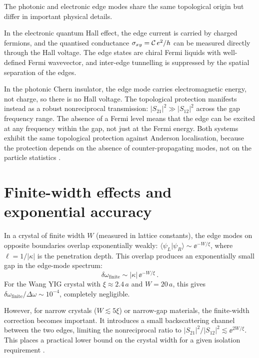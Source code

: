 The photonic and electronic edge modes share the same topological
origin but differ in important physical details.

In the electronic quantum Hall effect, the edge current is carried by
charged fermions, and the quantised conductance
$\sigma_{xy}=\mathcal{C}\,e^2/h$ can be measured directly through the Hall
voltage.  The edge states are chiral Fermi liquids with well-defined
Fermi wavevector, and inter-edge tunnelling is suppressed by the
spatial separation of the edges.

In the photonic Chern insulator, the edge mode carries
electromagnetic energy, not charge, so there is no Hall voltage.
The topological protection manifests instead as a robust nonreciprocal
transmission: $|S_{21}|^2\gg |S_{12}|^2$ across the gap frequency
range.  The absence of a Fermi level means that the edge can be
excited at any frequency within the gap, not just at the Fermi energy.
Both systems exhibit the same topological protection against Anderson
localisation, because the protection depends on the absence of
counter-propagating modes, not on the particle statistics
\cite{ozawa2018topological,price2022roadmap}.

\section{Finite-width effects and exponential accuracy}
\label{sec:ch8-finite-width}

In a crystal of finite width $W$ (measured in lattice constants), the
edge modes on opposite boundaries overlap exponentially weakly:
$\langle\psi_L|\psi_R\rangle\sim\ee^{-W/\xi}$, where
$\ell=1/|\kappa|$ is the penetration depth.  This overlap produces
an exponentially small gap in the edge-mode spectrum:
\begin{equation}\label{eq:ch8-finite-gap}
  \delta\omega_{\mathrm{finite}}
  \sim |\kappa|\,\ee^{-W/\xi}\,.
\end{equation}
For the Wang YIG crystal with $\xi\approx 2.4\,a$ and $W=20\,a$, this
gives $\delta\omega_{\mathrm{finite}}/\Delta\omega\sim 10^{-4}$,
completely negligible.

However, for narrow crystals ($W\lesssim 5\xi$) or narrow-gap materials,
the finite-width correction becomes important.  It introduces a small
backscattering channel between the two edges, limiting the
nonreciprocal ratio to $|S_{21}|^2/|S_{12}|^2\lesssim
\ee^{2W/\xi}$.  This places a practical lower bound on the crystal
width for a given isolation requirement
\cite{ozawa2018topological,haldane2008possible}.

